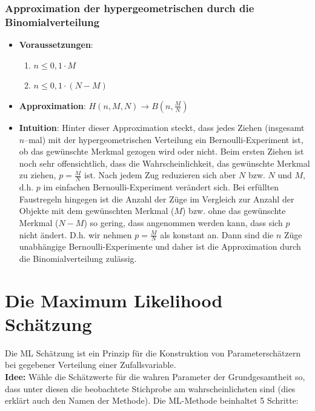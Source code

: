 \documentclass[a4paper]{article}
\begin{document}
\subsubsection{Approximation der hypergeometrischen durch die Binomialverteilung}\label{sec:HypBin}
\begin{itemize}
\item[] \textbf{Voraussetzungen}: \begin{enumerate}
\item $n \leq 0,1\cdot M$
\item $n \leq 0,1\cdot (N-M)$
\end{enumerate}
\item[] \textbf{Approximation}: $H(n,M,N) \rightarrow B(n, \frac{M}{N})$
\item[] \textbf{Intuition}: Hinter dieser Approximation steckt, dass jedes Ziehen (insgesamt $n$--mal) mit der hypergeometrischen Verteilung ein Bernoulli-Experiment ist, ob das gewünschte Merkmal gezogen wird oder nicht. Beim ersten Ziehen ist noch sehr offensichtlich, dass die Wahrscheinlichkeit, das gewünschte Merkmal zu ziehen, $p=\frac{M}{N}$ ist. Nach jedem Zug reduzieren sich aber $N$ bzw. $N$ und $M$, d.h. $p$ im einfachen Bernoulli-Experiment verändert sich. Bei erfüllten Faustregeln hingegen ist die Anzahl der Züge im Vergleich zur Anzahl der Objekte mit dem gewünschten Merkmal ($M$) bzw. ohne das gewünschte Merkmal ($N-M$) so gering, dass angenommen werden kann, dass sich $p$ nicht ändert. D.h. wir nehmen $p=\frac{M}{N}$ als konstant an. Dann sind die $n$ Züge unabhängige Bernoulli-Experimente und daher ist die Approximation durch die Binomialverteilung zulässig.
\end{itemize}




\newpage




\section{Die Maximum Likelihood Schätzung}\label{sec:ML}

Die ML Schätzung ist ein Prinzip für die Konstruktion von Parameterschätzern bei gegebener Verteilung einer Zufallsvariable.\\

\noindent \textbf{Idee:} Wähle die Schätzwerte für die wahren Parameter der Grundgesamtheit so, dass unter diesen die beobachtete Stichprobe am wahrscheinlichsten sind (dies erklärt auch den Namen der Methode). Die ML-Methode beinhaltet 5 Schritte:
\end{document}
